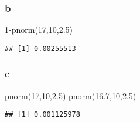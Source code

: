 \documentclass[
]{article}
\newenvironment{Shaded}{\begin{snugshade}}{\end{snugshade}}
\newcommand{\DecValTok}[1]{\textcolor[rgb]{0.00,0.00,0.81}{#1}}
\newcommand{\FloatTok}[1]{\textcolor[rgb]{0.00,0.00,0.81}{#1}}
\newcommand{\FunctionTok}[1]{\textcolor[rgb]{0.00,0.00,0.00}{#1}}
\newcommand{\NormalTok}[1]{#1}
\newcommand{\SpecialCharTok}[1]{\textcolor[rgb]{0.00,0.00,0.00}{#1}}
\begin{document}
\hypertarget{b-2}{%
\subsubsection{b}\label{b-2}}

\begin{Shaded}
\begin{Highlighting}[]
\DecValTok{1}\SpecialCharTok{{-}}\FunctionTok{pnorm}\NormalTok{(}\DecValTok{17}\NormalTok{,}\DecValTok{10}\NormalTok{,}\FloatTok{2.5}\NormalTok{)}
\end{Highlighting}
\end{Shaded}

\begin{verbatim}
## [1] 0.00255513
\end{verbatim}

\hypertarget{c-1}{%
\subsubsection{c}\label{c-1}}

\begin{Shaded}
\begin{Highlighting}[]
\FunctionTok{pnorm}\NormalTok{(}\DecValTok{17}\NormalTok{,}\DecValTok{10}\NormalTok{,}\FloatTok{2.5}\NormalTok{)}\SpecialCharTok{{-}}\FunctionTok{pnorm}\NormalTok{(}\FloatTok{16.7}\NormalTok{,}\DecValTok{10}\NormalTok{,}\FloatTok{2.5}\NormalTok{)}
\end{Highlighting}
\end{Shaded}

\begin{verbatim}
## [1] 0.001125978
\end{verbatim}
\end{document}
